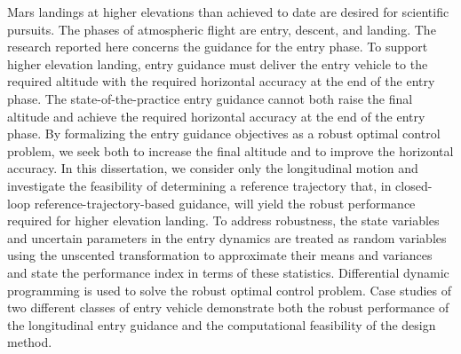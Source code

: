 \thesisabstract
{
  Mars landings at higher elevations than achieved to date are desired for scientific pursuits. The phases of atmospheric flight are entry, descent, and landing. The research reported here concerns the guidance for the entry phase. To support higher elevation landing, entry guidance must deliver the entry vehicle to the required altitude with the required horizontal accuracy at the end of the entry phase. The state-of-the-practice entry guidance cannot both raise the final altitude and achieve the required horizontal accuracy at the end of the entry phase. By formalizing the entry guidance objectives as a robust optimal control problem, we seek both to increase the final altitude and to improve the horizontal accuracy. In this dissertation, we consider only the longitudinal motion and investigate the feasibility of determining a reference trajectory that, in closed-loop reference-trajectory-based guidance, will yield the robust performance required for higher elevation landing. To address robustness, the state variables and uncertain parameters in the entry dynamics are treated as random variables using the unscented transformation to approximate their means and variances and state the performance index in terms of these statistics. Differential dynamic programming is used to solve the robust optimal control problem. Case studies of two different classes of entry vehicle demonstrate both the robust performance of the longitudinal entry guidance and the computational feasibility of the design method.

}


